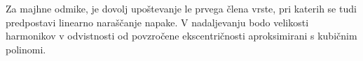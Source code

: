 Za majhne odmike, je dovolj upoštevanje le prvega člena vrste, pri katerih se tudi predpostavi linearno naraščanje napake. V nadaljevanju bodo velikosti harmonikov v odvistnosti od povzročene ekscentričnosti aproksimirani s kubičnim polinomi. %
